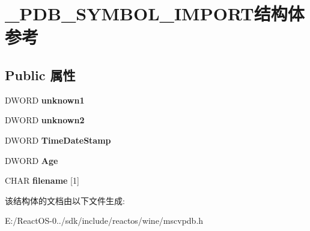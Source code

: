 \hypertarget{struct___p_d_b___s_y_m_b_o_l___i_m_p_o_r_t}{}\section{\+\_\+\+P\+D\+B\+\_\+\+S\+Y\+M\+B\+O\+L\+\_\+\+I\+M\+P\+O\+R\+T结构体 参考}
\label{struct___p_d_b___s_y_m_b_o_l___i_m_p_o_r_t}
\subsection*{Public 属性}
\begin{DoxyCompactItemize}
\item 
\mbox{\label{struct___p_d_b___s_y_m_b_o_l___i_m_p_o_r_t_a1893f9802b2b9ed1071a1ab844a3f4b1}} 
D\+W\+O\+RD {\bfseries unknown1}
\item 
\mbox{\label{struct___p_d_b___s_y_m_b_o_l___i_m_p_o_r_t_ae0dbb795c5ed7605ab6e3c6991dc3c21}} 
D\+W\+O\+RD {\bfseries unknown2}
\item 
\mbox{\label{struct___p_d_b___s_y_m_b_o_l___i_m_p_o_r_t_ae04cc2bc29c6b2d355d0c6d0217db089}} 
D\+W\+O\+RD {\bfseries Time\+Date\+Stamp}
\item 
\mbox{\label{struct___p_d_b___s_y_m_b_o_l___i_m_p_o_r_t_ae73de5bf285e2f278ad510a7adbcda37}} 
D\+W\+O\+RD {\bfseries Age}
\item 
\mbox{\label{struct___p_d_b___s_y_m_b_o_l___i_m_p_o_r_t_a3bf69ec420f6906a2034f0dae1eb6923}} 
C\+H\+AR {\bfseries filename} \mbox{[}1\mbox{]}
\end{DoxyCompactItemize}


该结构体的文档由以下文件生成\+:\begin{DoxyCompactItemize}
\item 
E\+:/\+React\+O\+S-\/0../sdk/include/reactos/wine/mscvpdb.\+h\end{DoxyCompactItemize}
